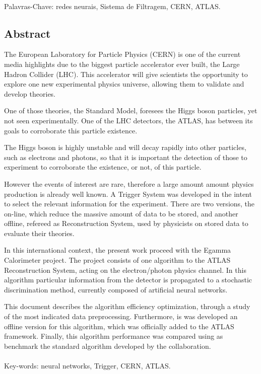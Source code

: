 \paragraph{}

\noindent Palavras-Chave:  redes neurais, Sistema de Filtragem, CERN, ATLAS.

\vfill

\cleardoublepage

\vfill
\begin{center}
\section*{Abstract\label{Abstract}}
\end{center}

The European Laboratory for Particle Physics (CERN) is one of the current
media highlights due to the biggest particle accelerator ever built, the Large Hadron
Collider (LHC). This accelerator will give scientists the opportunity to explore 
one new experimental physics universe, allowing them to validate and develop
theories.

One of those theories, the Standard Model, foresees the Higgs boson particles,
yet not seen experimentally. One of the LHC detectors, the ATLAS, has between
its goals to corroborate this particle existence.

The Higgs boson is highly unstable and will decay rapidly into other particles,
such as electrons and photons, so that it is important the detection of those to
experiment to corroborate the existence, or not, of this particle.

However the events of interest are rare, therefore a large amount amount physics
production is already well known. A Trigger System was developed in the
intent to select the relevant information for the experiment. There are two
versions, the on-line, which reduce the massive amount of data
to be stored, and another offline, refereed as Reconstruction System, used by 
physicists on stored data to evaluate their theories.

In this international context, the present work proceed with the Egamma
Calorimeter project. The project consists of one algorithm to the ATLAS
Reconstruction System, acting on the electron/photon physics channel. In this
algorithm particular information from the detector is propagated to a stochastic
discrimination method, currently composed of artificial neural networks.

This document describes the algorithm efficiency optimization, through a study
of the most indicated data preprocessing. Furthermore, is was developed an
offline version for this algorithm, which was officially added to the ATLAS
framework. Finally, this algorithm performance was compared using as benchmark
the standard algorithm developed by the collaboration.


\paragraph{}

\noindent Key-words: neural networks, Trigger, CERN, ATLAS.


\vfill
